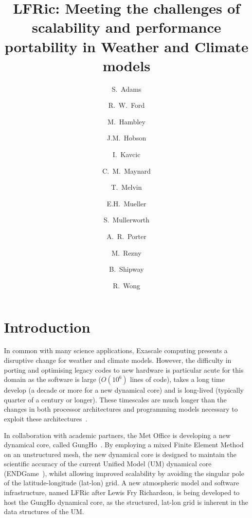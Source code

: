 \documentclass[review,times]{elsarticle}
\begin{document}
\begin{frontmatter}

\title{LFRic: Meeting the challenges of scalability and performance portability in Weather and Climate models}

\author[met]{S.~Adams}
\author[hartree]{R.~W.~Ford}
\author[met]{M.~Hambley}
\author[met]{J.M.~Hobson}
\author[met]{I.~Kavcic}
\author[met,read]{C.~M.~Maynard}
\author[met]{T.~Melvin}
\author[bath]{E.H.~Mueller}
\author[met]{S.~Mullerworth}
\author[hartree]{A.~R.~Porter}
\author[downunder]{M.~Rezny}
\author[met]{B.~Shipway}
\author[met]{R.~Wong}


\address[met]{Met Office, FitzRoy Road, Exeter, EX1 3PB}
\address[hartree]{Hartree Centre, STFC Daresbury, Grim up North}
\address[read]{Department of Computer Science, Polly Vacher Building,
  University of Reading, Reading, UK, RG6 6AY}
\address[bath]{Department of Mathematics, University of Bath, Bath}
\address[downunder]{Monash University, Melbourne, Australia}

\begin{abstract}
\end{abstract}

\begin{keyword}

\end{keyword}

\end{frontmatter}

\newpage
\section{Introduction}
In common with many science applications, Exascale computing presents
a disruptive change for weather and climate models. However, the
difficulty in porting and optimising legacy codes to new hardware is
particular acute for this domain as the software is large ($O(10^6)$
lines of code), takes a long time develop (a decade or more for a new
dynamical core) and is long-lived (typically quarter of a century or longer). These
timescales are much longer than the changes in both processor
architectures and programming models necessary to exploit these
architectures~\cite{gmd-2017-186}.

In collaboration with academic partners, the Met Office is developing
a new dynamical core, called GungHo~\cite{melvin2018}. By employing a
mixed Finite Element Method on an unstructured mesh, the new dynamical
core is designed to maintain the scientific accuracy of the current
Unified Model (UM) dynamical core (ENDGame~\cite{QJ:QJ2235}), whilst
allowing improved scalability by avoiding the singular pole of the
latitude-longitude (lat-lon) grid. A new atmospheric model and software infrastructure,
named LFRic after Lewis Fry Richardson, is being developed to host the
GungHo dynamical core, as the structured,  lat-lon
grid is inherent in the data structures of the UM.
\end{document}
